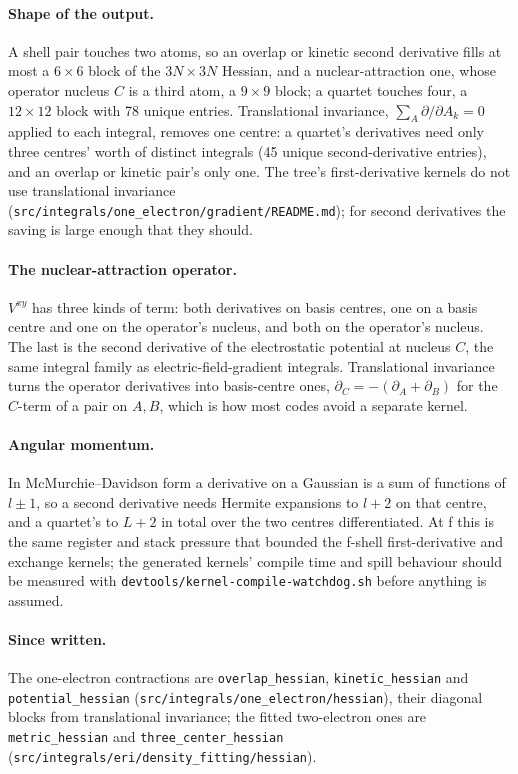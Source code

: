 \documentclass[11pt]{article}
\newcommand{\code}[1]{\texttt{#1}}
\begin{document}
\paragraph{Shape of the output.} A shell pair touches two atoms, so an
overlap or kinetic second derivative fills at most a $6\times6$ block of
the $3N\times3N$ Hessian, and a nuclear-attraction one, whose operator
nucleus $C$ is a third atom, a $9\times9$ block; a quartet touches four, a
$12\times12$ block with 78 unique entries. Translational invariance,
$\sum_A \partial/\partial A_k = 0$ applied to each integral, removes one
centre: a quartet's derivatives need only three centres' worth of distinct
integrals (45 unique second-derivative entries), and an overlap or kinetic
pair's only one. The tree's first-derivative kernels do not use
translational invariance
(\code{src/integrals/one\_electron/gradient/README.md}); for second
derivatives the saving is large enough that they should.

\paragraph{The nuclear-attraction operator.} $V^{xy}$ has three kinds of
term: both derivatives on basis centres, one on a basis centre and one on
the operator's nucleus, and both on the operator's nucleus. The last is
the second derivative of the electrostatic potential at nucleus $C$, the
same integral family as electric-field-gradient integrals. Translational
invariance turns the operator derivatives into basis-centre ones,
$\partial_C = -(\partial_A + \partial_B)$ for the $C$-term of a pair on
$A,B$, which is how most codes avoid a separate kernel.

\paragraph{Angular momentum.} In McMurchie--Davidson form a derivative on
a Gaussian is a sum of functions of $l\pm1$, so a second derivative needs
Hermite expansions to $l+2$ on that centre, and a quartet's to $L+2$ in
total over the two centres differentiated. At f this is the same register
and stack pressure that bounded the f-shell first-derivative and exchange
kernels; the generated kernels' compile time and spill behaviour should be
measured with \code{devtools/kernel-compile-watchdog.sh} before anything
is assumed.

\paragraph{Since written.} The one-electron contractions are
\code{overlap\_hessian}, \code{kinetic\_hessian} and
\code{potential\_hessian} (\code{src/integrals/one\_electron/hessian}),
their diagonal blocks from translational invariance; the fitted
two-electron ones are \code{metric\_hessian} and
\code{three\_center\_hessian}
(\code{src/integrals/eri/density\_fitting/hessian}).
\end{document}
